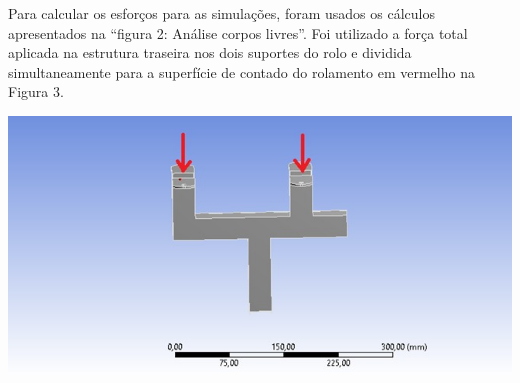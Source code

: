 Para calcular os esforços para as simulações, foram usados os cálculos apresentados na “figura 2: Análise corpos livres”.  Foi utilizado a força total aplicada na estrutura traseira nos dois suportes do rolo e dividida simultaneamente para a superfície de contado do rolamento em vermelho na Figura 3.

    \begin{center}
    	\includegraphics[scale=0.7]{figuras/forcas_3}
        \label{forcas_3}
    \end{center} 
  
